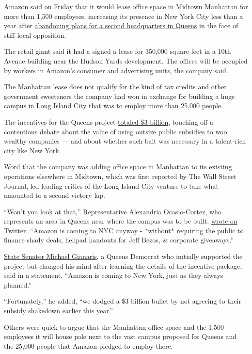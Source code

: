 Amazon said on Friday that it would lease office space in Midtown
Manhattan for more than 1,500 employees, increasing its presence in New
York City less than a year after
\href{https://www.nytimes.com/2019/02/14/nyregion/amazon-hq2-queens.html}{abandoning
plans for a second headquarters in Queens} in the face of stiff local
opposition.

The retail giant said it had a signed a lease for 350,000 square feet in
a 10th Avenue building near the Hudson Yards development. The offices
will be occupied by workers in Amazon's consumer and advertising units,
the company said.

The Manhattan lease does not qualify for the kind of tax credits and
other government sweeteners the company had won in exchange for building
a huge campus in Long Island City that was to employ more than 25,000
people.

The incentives for the Queens project
\href{https://www.nytimes.com/2019/02/14/upshot/amazon-foxconn-subsidies-critics.html}{totaled
\$3 billion}, touching off a contentious debate about the value of using
outsize public subsidies to woo wealthy companies --- and about whether
such bait was necessary in a talent-rich city like New York.

Word that the company was adding office space in Manhattan to its
existing operations elsewhere in Midtown, which was first reported by
The Wall Street Journal, led leading critics of the Long Island City
venture to take what amounted to a second victory lap.

``Won't you look at that,'' Representative Alexandria Ocasio-Cortez, who
represents an area in Queens near where the campus was to be built,
\href{https://twitter.com/AOC/status/1203083485252112384}{wrote on
Twitter}. ``Amazon is coming to NYC anyway - *without* requiring the
public to finance shady deals, helipad handouts for Jeff Bezos, \&
corporate giveaways.''

\href{https://www.nytimes.com/2019/02/04/nyregion/amazon-hq2-board-veto.html}{State
Senator Michael Gianaris}, a Queens Democrat who initially supported the
project but changed his mind after learning the details of the incentive
package, said in a statement, ``Amazon is coming to New York, just as
they always planned.''

``Fortunately,'' he added, ``we dodged a \$3 billion bullet by not
agreeing to their subsidy shakedown earlier this year.''

Others were quick to argue that the Manhattan office space and the 1,500
employees it will house pale next to the vast campus proposed for Queens
and the 25,000 people that Amazon pledged to employ there.

